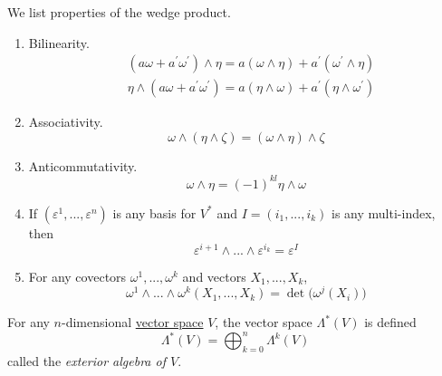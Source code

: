 \documentclass{article}
\newcounter{theorem}[section]
\newcounter{definition}[section]
\begin{document}
    \begin{theorem}
      \label{thm:properties-of-the-wedge-product}
    We list properties of the wedge product. 
    \begin{enumerate}
        \item Bilinearity. 
        \begin{align*}
            & (a \omega + a^\prime \omega^\prime) \wedge \eta = a (\omega \wedge \eta) + a^\prime (\omega^\prime \wedge \eta) \\
            & \eta \wedge (a \omega + a^\prime \omega^\prime) = a (\eta \wedge \omega) + a^\prime (\eta \wedge \omega^\prime) 
        \end{align*}
        \item Associativity. 
        \begin{equation}
          \omega \wedge (\eta \wedge \zeta) = (\omega \wedge \eta) \wedge \zeta
        \end{equation}
        \item Anticommutativity. 
        \begin{equation}
          \omega \wedge \eta = (-1)^{kl} \eta \wedge \omega
        \end{equation}
        \item If $(\varepsilon^1, ..., \varepsilon^n)$ is any basis for $V^*$ and $I = (i_1,..., i_k)$ is any multi-index, then 
        \begin{equation}
          \varepsilon^{i+1} \wedge ... \wedge \varepsilon^{i_k} = \varepsilon^I
        \end{equation}
        \item For any covectors $\omega^1, ..., \omega^k$ and vectors $X_1, ..., X_k$, 
        \begin{equation}
          \omega^1 \wedge ... \wedge \omega^k (X_1, ..., X_k) = \det \big( \omega^j (X_i)\big)
        \end{equation}
    \end{enumerate}
    \end{theorem}

    \begin{definition}
      \label{def:exterior-algebra-of-v}
    For any $n$-dimensional \hyperref[lin-def:vector-space]{vector space} $V$, the vector space $\Lambda^* (V)$ is defined
    \begin{equation}
      \Lambda^* (V) = \bigoplus_{k=0}^n \Lambda^k (V)
    \end{equation}
    called the \textit{exterior algebra of $V$}. 
    \end{definition}
\end{document}
